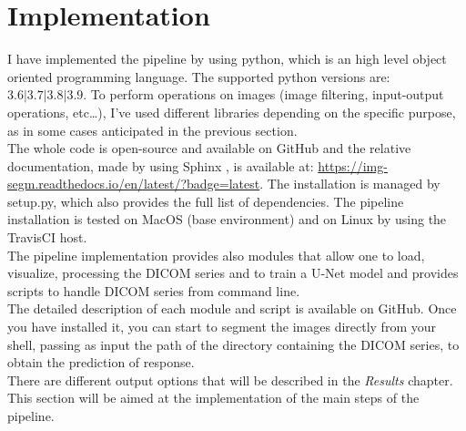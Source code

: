 \documentclass{standalone}
\begin{document}
\section{Implementation}

I have implemented the pipeline by using python, which is an high level object oriented programming language. 
The supported python versions are: $3.6| 3.7| 3.8| 3.9$.
To perform operations on images (image filtering, input-output operations, etc\dots), I've used different libraries depending on the specific purpose, as in some cases anticipated in the previous section.
\\
The whole code is open-source and available on GitHub \cite{img-segm} and the relative documentation, made by using Sphinx \cite{Sphinx}, is available at: \url{https://img-segm.readthedocs.io/en/latest/?badge=latest}.
The installation is managed by setup.py, which also provides the full list of dependencies.
The pipeline installation is tested on MacOS (base environment) and on Linux by using the TravisCI host.
\\
The pipeline implementation provides also modules that allow one to load, visualize, processing the DICOM series and to train a U-Net model and provides scripts to handle DICOM series from command line. 
\\
The detailed description of each module and script is available on GitHub.
Once you have installed it, you can start to segment the images directly from your shell, passing as input the path of the directory containing the DICOM series, to obtain the prediction of response.
\\
There are different output options that will be described in the \textit{Results} chapter.\\
This section will be aimed at the implementation of the main steps of the pipeline.
\end{document}
